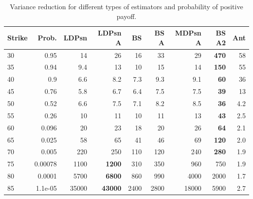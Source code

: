 \begin{table}[htbp]
\centering
\begin{tabular}{lrrrrrrrr}
\toprule
Strike &   Prob. &  LDPsn &  LDPsn A &   BS &  BS A &  MDPsn A &  BS A2 &  Ant \\
\midrule
30 &    0.95 &     14 &       26 &   16 &    33 &           29  &    \textbf{470} &   58 \\
35 &    0.94 &    9.4 &       13 &   10 &    15 &           14  &    \textbf{150} &   55 \\
40 &     0.9 &    6.6 &      8.2 &  7.3 &   9.3 &          9.1  &     \textbf{60} &   36 \\
45 &    0.76 &    5.8 &      6.7 &  6.4 &   7.5 &          7.5  &     \textbf{39} &   13 \\
50 &    0.52 &    6.6 &      7.5 &  7.1 &   8.2 &          8.5  &     \textbf{36} &  4.2 \\
55 &    0.26 &     10 &       11 &   10 &    11 &           13  &     \textbf{43} &  2.5 \\
60 &   0.096 &     20 &       23 &   18 &    20 &           26  &     \textbf{64} &  2.1 \\
65 &   0.025 &     58 &       65 &   41 &    46 &           69  &    \textbf{120} &  2.0 \\
70 &   0.005 &    220 &      250 &  110 &   120 &          240  &    \textbf{280} &  1.9 \\
75 & 0.00078 &   1100 &     \textbf{1200} &  310 &   350 &          960 &    750 &  1.9 \\
80 &  0.0001 &   5700 &     \textbf{6800} &  860 &   990 &         4000 &   2000 &  1.7 \\
85 & 1.1e-05 &  35000 &    \textbf{43000} & 2400 &  2800 &        18000 &   5900 &  2.7 \\
\bottomrule
\end{tabular}
\bigskip
\caption{Variance reduction for different types of estimators and probability of positive payoff.}\label{tab:VarRedu}
\end{table}

